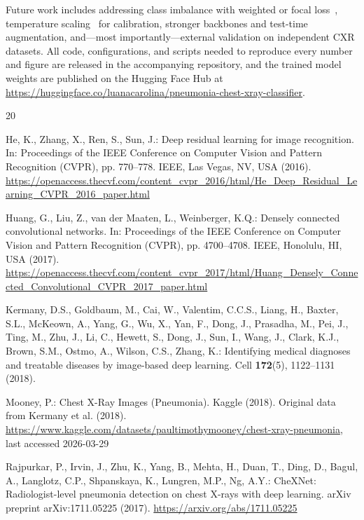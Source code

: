 \documentclass[runningheads]{llncs}
\begin{document}
Future work includes addressing class imbalance with weighted or focal
loss~\cite{ref_focal}, temperature scaling~\cite{ref_calibration} for
calibration, stronger backbones and test-time augmentation, and---most
importantly---external validation on independent CXR datasets. All code,
configurations, and scripts needed to reproduce every number and figure are
released in the accompanying repository, and the trained model weights are
published on the Hugging Face Hub at
\url{https://huggingface.co/luanacarolina/pneumonia-chest-xray-classifier}.

\newpage

%
%
\begin{thebibliography}{20}


He, K., Zhang, X., Ren, S., Sun, J.: Deep residual learning for image
recognition. In: Proceedings of the IEEE Conference on Computer Vision and
Pattern Recognition (CVPR), pp. 770--778. IEEE, Las Vegas, NV, USA (2016).
\url{https://openaccess.thecvf.com/content_cvpr_2016/html/He_Deep_Residual_Learning_CVPR_2016_paper.html}

Huang, G., Liu, Z., van der Maaten, L., Weinberger, K.Q.: Densely connected
convolutional networks. In: Proceedings of the IEEE Conference on Computer
Vision and Pattern Recognition (CVPR), pp. 4700--4708. IEEE, Honolulu, HI,
USA (2017).
\url{https://openaccess.thecvf.com/content_cvpr_2017/html/Huang_Densely_Connected_Convolutional_CVPR_2017_paper.html}

Kermany, D.S., Goldbaum, M., Cai, W., Valentim, C.C.S., Liang, H., Baxter,
S.L., McKeown, A., Yang, G., Wu, X., Yan, F., Dong, J., Prasadha, M., Pei,
J., Ting, M., Zhu, J., Li, C., Hewett, S., Dong, J., Sun, I., Wang, J.,
Clark, K.J., Brown, S.M., Ostmo, A., Wilson, C.S., Zhang, K.: Identifying
medical diagnoses and treatable diseases by image-based deep learning.
Cell \textbf{172}(5), 1122--1131 (2018). 

Mooney, P.: Chest X-Ray Images (Pneumonia). Kaggle (2018). Original data from
Kermany et al. (2018).
\url{https://www.kaggle.com/datasets/paultimothymooney/chest-xray-pneumonia},
last accessed 2026-03-29

Rajpurkar, P., Irvin, J., Zhu, K., Yang, B., Mehta, H., Duan, T., Ding, D.,
Bagul, A., Langlotz, C.P., Shpanskaya, K., Lungren, M.P., Ng, A.Y.: CheXNet:
Radiologist-level pneumonia detection on chest X-rays with deep learning.
arXiv preprint arXiv:1711.05225 (2017).
\url{https://arxiv.org/abs/1711.05225}


\end{thebibliography}
\end{document}

